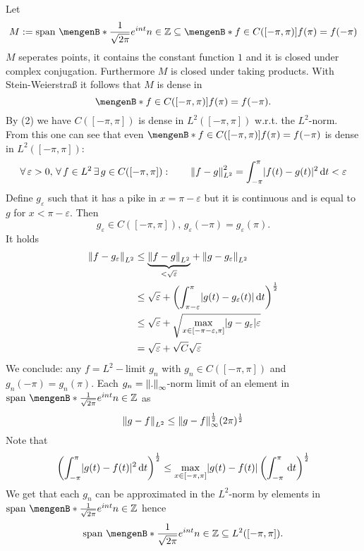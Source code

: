 \begin{beweis}
	Let \[
		M := \text{span }\set[\frac{1}{\sqrt{2 \pi}}e^{int}]{n \in \mathbb{Z}} \subseteq \set[f \in C([-\pi, \pi])]{f( \pi) = f(-\pi)}
	\]
	$M$ seperates points, it contains the constant function $1$ and it is closed under complex conjugation. Furthermore $M$ is closed under taking products. With Stein-Weierstraß it follows that $M$ is dense in 
	\[
		\set[f \in C([-\pi,\pi])]{f(\pi)= f(-\pi)}.
	\]
	By (2) we have $C([-\pi,\pi])$ is dense in $L^2([-\pi,\pi])$ w.r.t. the $L^2$-norm. From this one can see that even $\set[f \in C([-\pi,\pi])]{f(\pi)= f(-\pi)}$ is dense in $L^2([-\pi,\pi])$:
	\[
		\forall\,  \varepsilon>0, \,\forall\, f \in L^2 \,\exists\,g \in C([-\pi,\pi]): \qquad \norm{f-g}_{L^2}^2 = \int_{-\pi}^{\pi}\abs{f(t)-g(t)}^2 \,\mathrm{d}t < \varepsilon
	\] 
	Define $g _{\varepsilon}$ such that it has a pike in $x = \pi - \varepsilon$ but it is continuous and is equal to $g$ for $x < \pi -\varepsilon$. Then
	\[
		g _{\varepsilon} \in C([-\pi,\pi]), \,g _{\varepsilon}(- \pi) = g _{\varepsilon} ( \pi).
	\]
	It holds
	\begin{align*}
		\norm{f - g _{\varepsilon}}_{L^2} &\leq \underset{< \sqrt{\varepsilon}}{\underbrace{\norm{f-g}_{L^2}}} + 
		\norm{g - g _{\varepsilon}}_{L^2} \\
		&\leq  \sqrt{\varepsilon} + \left( \int_{\pi - \varepsilon}^{\pi} \abs{g(t)-g _{\varepsilon}(t)} \,\mathrm{d}t  \right)^{\frac{1}{2}} \\
		&\leq \sqrt{\varepsilon} + \sqrt{\max_{x \in [-\pi - \varepsilon, \pi]} \abs{g- g _{\varepsilon}}\varepsilon} \\
		&= \sqrt{\varepsilon} + \sqrt{C} \sqrt{\varepsilon}
	\end{align*}
	We conclude: any $f = L^2-$limit $g_n$ with $g_n \in C([-\pi,\pi])$ and $g_n(- \pi ) = g_n( \pi)$. Each $g_n = \norm{.}_\infty$-norm limit of an element in 
	$ \text{span }\set[\frac{1}{\sqrt{2 \pi}}e^{int}]{n \in \mathbb{Z}}$ as
	\[
		\norm{g-f}_{L^2} \leq \norm{g-f}^{\frac{1}{2}}_{\infty} (2 \pi)^{\frac{1}{2}}
	\]
	Note that
	\[
		\left( \int_{- \pi}^{\pi} \lvert g(t)-f(t)\rvert^2 \,\mathrm{d}t \right)^{\frac{1}{2}} \leq \max_{x \in [ - \pi, \pi]} \lvert g(t)- f(t)\rvert \left( \int_{- \pi}^{\pi} \,\mathrm{d}t \right)^{\frac{1}{2}}
	\]
	We get that each $g_n$ can be approximated in the $L^2$-norm by elements in $\text{span }\set[\frac{1}{\sqrt{2 \pi}}e^{int}]{n \in \mathbb{Z}}$ hence
	\[
		\text{span }\set[\frac{1}{\sqrt{2 \pi}}e^{int}]{n \in \mathbb{Z}} \subseteq L^2([- \pi,\pi]).
	\]
\end{beweis}

